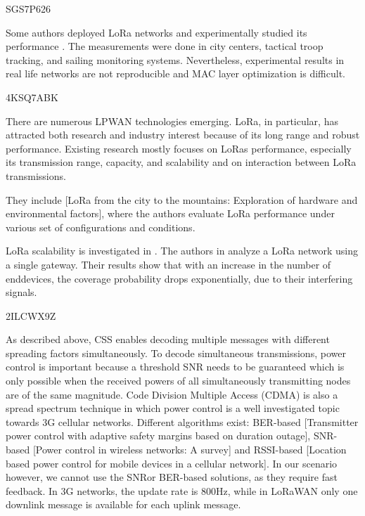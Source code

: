 \cite{ochoa_large_2018} SGS7P626

Some authors deployed LoRa networks and experimentally studied its performance  \cite{aref_free_2014}
\cite{petajajarvi_coverage_2015-1}
\cite{wixted_evaluation_2016}
\cite{san-um_long-range_2017}
\cite{li_application_2017}.
The measurements were done in city centers,
	tactical troop tracking,
	and sailing monitoring systems.
Nevertheless,
	experimental results in real life networks are not reproducible and MAC layer optimization is difficult.





\cite{orfanidis_investigating_2017} 4KSQ7ABK

There are numerous LPWAN technologies emerging.
LoRa,
	in particular,
	has attracted both research and industry interest because of its long range and robust performance.
Existing research mostly focuses on LoRas performance,
	especially its transmission range,
	capacity,
	and scalability and on interaction between LoRa transmissions.

They include \cite{bor_lora_2017} \cite{augustin_study_2016} [LoRa from the city to the mountains:
	Exploration of hardware and environmental factors],
	where the authors evaluate LoRa performance under various set of configurations and conditions.

LoRa scalability is investigated in \cite{georgiou_low_2017}\cite{voigt_mitigating_2016}\cite{adelantado_understanding_2017}.
The authors in \cite{georgiou_low_2017} analyze a LoRa network using a single gateway.
Their results show that with an increase in the number of enddevices,
	the coverage probability drops exponentially,
	due to their interfering signals.



\cite{reynders_power_2017} 2ILCWX9Z

As described above,
	CSS enables decoding multiple messages with different spreading factors simultaneously.
To decode simultaneous transmissions,
	power control is important because a threshold SNR needs to be guaranteed which is only possible when the received powers of all simultaneously transmitting nodes are of the same magnitude.
Code Division Multiple Access (CDMA) is also a spread spectrum technique in which power control is a well investigated topic towards 3G cellular networks.
Different algorithms exist:
	BER-based [Transmitter power control with adaptive safety margins based on duration outage],
	SNR-based [Power control in wireless networks:
	A survey] and RSSI-based [Location based power control for mobile devices in a cellular network].
In our scenario however,
	we cannot use the SNRor BER-based solutions,
	as they require fast feedback.
In 3G networks,
	the update rate is 800Hz,
	while in LoRaWAN only one downlink message is available for each uplink message.

